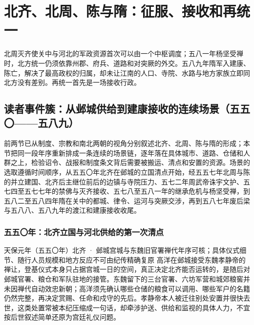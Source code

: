 \chapter{北齐、北周、陈与隋：征服、接收和再统一}
\label{ch:northern-qi-zhou-chen-sui}





\begin{turningpoint}[五八九年不是终点线]
北周灭齐使关中与河北的军政资源首次可以由一个中枢调度；五八一年杨坚受禅时，北方统一仍须依靠州郡、府兵、道路和对突厥的外交。五八九年隋军入建康、陈亡，解决了最高政权的归属，却未让江南的人口、寺院、水路与地方家族立即同北方没有差别。再统一首先是一场接收行政。
\end{turningpoint}

\section{读者事件簇：从邺城供给到建康接收的连续场景（五五〇——五八九）}

前两节已从制度、宗教和南北两朝的视角分别叙述北齐、北周、陈与隋的形成；本节把同一段年序重新排成一条连续的场景链，逐年落在具体城市、道路、仓储和人群之上，检验诏令、战报和制度条文背后需要被搬运、清点和安置的资源。场景的选取遵循时间顺序，从五五〇年北齐在邺城的立国清点开始，经五五七年北周与陈的并立建国、北齐后主继位前后的边镇与寺院压力、五七二年周武帝诛宇文护、五七四至五七七年的禁佛与灭齐接收、五七八至五八一年的继承危机与杨坚受禅，到五八二至五八四年隋在关中的都城、律令、运河与突厥交涉，再到五八七年废后梁与五八八、五八九年的渡江和建康接收收尾。

\subsection{五五〇年：北齐立国与河北供给的第一次清点}

\begin{event}{}{天保元年（五五〇年）}{北齐 · 邺城宫城与东魏旧官署}{禅代年序可核；具体仪式细节、随行人员规模和地方反应不可由纪传精确复原}
高洋在邺城接受东魏孝静帝的禅让，登基仪式本身只占据宫城一日的空间，真正决定北齐能否运转的，是随后对邺城官署、粮仓和军队驻地的接管。东魏留下的三台官署、六坊军营和城郊粮窖并未因禅代自动效忠新朝；高洋须先确认哪些仓储的粮食可以调用、哪些军户的名籍仍然完整，再决定赏赐、任命和戍守的先后。孝静帝本人被迁往别处安置并很快去世，这类处置常被本纪压缩成一句话，却牵涉护送、供给和监视的具体人力，不宜按后世叙述简单还原为宫廷礼仪问题。
\end{event}

